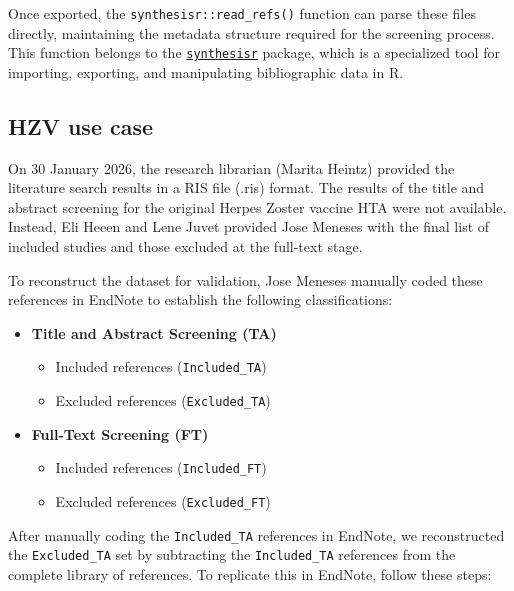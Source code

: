 \documentclass[
  letterpaper,
  DIV=11,
  numbers=noendperiod]{scrartcl}
\begin{document}
Once exported, the \texttt{synthesisr::read\_refs()} function can parse
these files directly, maintaining the metadata structure required for
the screening process. This function belongs to the
\href{https://cran.r-project.org/web/packages/synthesisr/vignettes/synthesisr_vignette.html}{\texttt{synthesisr}}
package, which is a specialized tool for importing, exporting, and
manipulating bibliographic data in R.

\subsection{HZV use case}\label{hzv-use-case}

On 30 January 2026, the research librarian (Marita Heintz) provided the
literature search results in a RIS file (.ris) format. The results of
the title and abstract screening for the original Herpes Zoster vaccine
HTA were not available. Instead, Eli Heeen and Lene Juvet provided Jose
Meneses with the final list of included studies and those excluded at
the full-text stage.

To reconstruct the dataset for validation, Jose Meneses manually coded
these references in EndNote to establish the following classifications:

\begin{itemize}
\item
  \textbf{Title and Abstract Screening (TA)}

  \begin{itemize}
  \item
    Included references (\texttt{Included\_TA})
  \item
    Excluded references (\texttt{Excluded\_TA})
  \end{itemize}
\item
  \textbf{Full-Text Screening (FT)}

  \begin{itemize}
  \item
    Included references (\texttt{Included\_FT})
  \item
    Excluded references (\texttt{Excluded\_FT})
  \end{itemize}
\end{itemize}

After manually coding the \texttt{Included\_TA} references in EndNote,
we reconstructed the \texttt{Excluded\_TA} set by subtracting the
\texttt{Included\_TA} references from the complete library of
references. To replicate this in EndNote, follow these steps:
\end{document}
